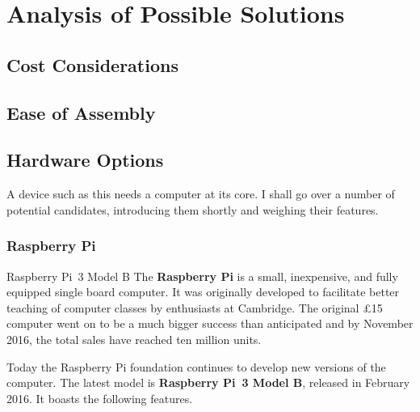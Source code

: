 \chapter{Analysis of Possible Solutions}
    \section{Cost Considerations}
        \blind[2]
    \section{Ease of Assembly}
        \blind[2]
    \section{Hardware Options}
        A device such as this needs a computer at its core.  I shall go over a number of potential candidates, introducing them shortly and weighing their features.
        \subsection{Raspberry Pi}
                {Raspberry Pi~3 Model B \cite{rpi-pimoroni}}
            The \textbf{Raspberry Pi} is a small, inexpensive, and fully equipped single board computer.  It was originally developed to facilitate better teaching of computer classes by enthusiasts at Cambridge\cite{bbc-15-pound-computer}.  The original £15 computer went on to be a much bigger success than anticipated and by November 2016, the total sales have reached ten million units\cite{rpi-ten-million}.
            
            Today the Raspberry Pi foundation continues to develop new versions of the computer\cite{rpi-products}.  The latest model is \textbf{Raspberry Pi~3 Model B}, released in February 2016.  It boasts the following features\cite{rpi-3}.
            
